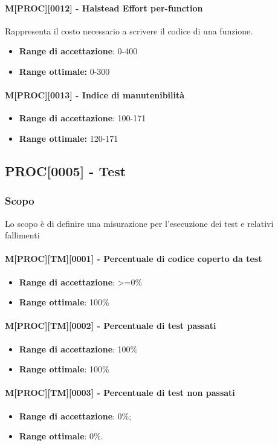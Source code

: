 \paragraph{M[PROC][0012] - Halstead Effort per-function} 
Rappresenta il costo necessario a scrivere il codice di una funzione.
\begin{itemize}
    \item \textbf{Range di accettazione}: 0-400
    \item \textbf{Range ottimale:} 0-300
\end{itemize}

\paragraph{M[PROC][0013] - Indice di manutenibilità}
\begin{itemize}
    \item \textbf{Range di accettazione}: 100-171
    \item \textbf{Range ottimale:} 120-171
\end{itemize}

\subsection{PROC[0005] - Test}

\subsubsection{Scopo} 
Lo scopo è di definire una misurazione per l'esecuzione dei test e relativi fallimenti
\paragraph{M[PROC][TM][0001] - Percentuale di codice coperto da test}
\begin{itemize}
    \item \textbf{Range di accettazione}: >=0\%
    \item \textbf{Range ottimale}: 100\%
\end{itemize}

\paragraph{M[PROC][TM][0002] - Percentuale di test passati}
\begin{itemize}
    \item \textbf{Range di accettazione}: 100\%
    \item \textbf{Range ottimale}: 100\%
\end{itemize}

\paragraph{M[PROC][TM][0003] - Percentuale di test non passati}
\begin{itemize}
    \item \textbf{Range di accettazione}: 0\%;
    \item \textbf{Range ottimale}: 0\%.
\end{itemize}


